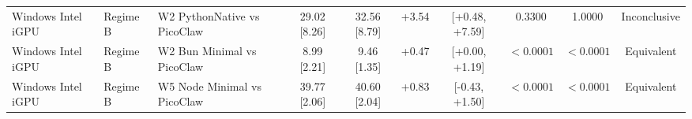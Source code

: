 \begin{table}[t]
{\begin{tabular}{lllccccccc}
Windows Intel iGPU & Regime B & W2 PythonNative vs PicoClaw & 29.02 [8.26] & 32.56 [8.79] & +3.54 & [+0.48, +7.59] & 0.3300 & 1.0000 & Inconclusive \\
Windows Intel iGPU & Regime B & W2 Bun Minimal vs PicoClaw & 8.99 [2.21] & 9.46 [1.35] & +0.47 & [+0.00, +1.19] & $< 0.0001$ & $< 0.0001$ & Equivalent \\
Windows Intel iGPU & Regime B & W5 Node Minimal vs PicoClaw & 39.77 [2.06] & 40.60 [2.04] & +0.83 & [-0.43, +1.50] & $< 0.0001$ & $< 0.0001$ & Equivalent \\
\bottomrule
\end{tabular}
}
\end{table}
